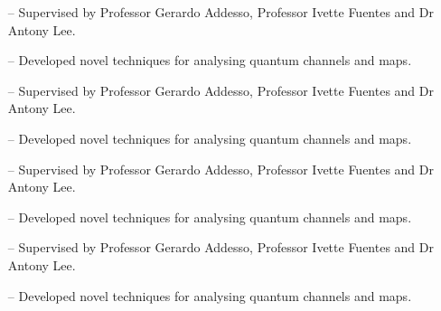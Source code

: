 \documentclass[10pt,a4paper]{altacv}
\begin{document}
\begin{itemize}
    \setlength{\itemindent}{0.5em}
    \item[--]   \small{Supervised by Professor Gerardo Addesso, Professor Ivette Fuentes and Dr Antony Lee.}
    \item[--]   \small{Developed novel techniques for analysing quantum channels and maps.}
\end{itemize}

\medskip


\begin{itemize}
    \setlength{\itemindent}{0.5em}
    \item[--]   \small{Supervised by Professor Gerardo Addesso, Professor Ivette Fuentes and Dr Antony Lee.}
    \item[--]   \small{Developed novel techniques for analysing quantum channels and maps.}
\end{itemize}

\medskip



\begin{itemize}
    \setlength{\itemindent}{0.5em}
    \item[--]   \small{Supervised by Professor Gerardo Addesso, Professor Ivette Fuentes and Dr Antony Lee.}
    \item[--]   \small{Developed novel techniques for analysing quantum channels and maps.}
\end{itemize}

\medskip



\begin{itemize}
    \setlength{\itemindent}{0.5em}
    \item[--]   \small{Supervised by Professor Gerardo Addesso, Professor Ivette Fuentes and Dr Antony Lee.}
    \item[--]   \small{Developed novel techniques for analysing quantum channels and maps.}
\end{itemize}
\end{document}
